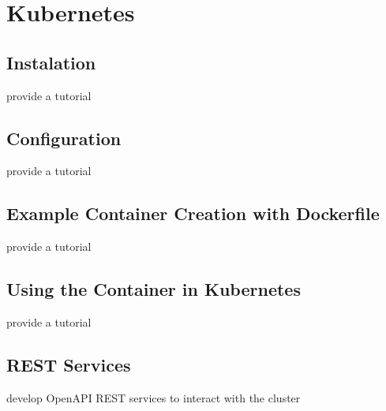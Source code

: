 \chapter{Kubernetes}

\section{Instalation}

\begin{exercise}
provide a tutorial 
\end{exercise}

\section{Configuration}

\begin{exercise}
provide a tutorial 
\end{exercise}

\section{Example Container Creation with Dockerfile}

\begin{exercise}
provide a tutorial 
\end{exercise}

\section{Using the Container in Kubernetes}

\begin{exercise}
provide a tutorial 
\end{exercise}

\section{REST Services}

\begin{exercise}
develop OpenAPI REST services to interact with the cluster
\end{exercise}

